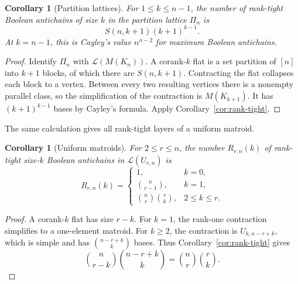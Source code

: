 \documentclass[11pt]{article}
\newtheorem{corollary}[theorem]{Corollary}
\theoremstyle{definition}
\theoremstyle{remark}
\newcommand{\cL}{\mathcal L}
\begin{document}
\begin{corollary}[Partition lattices]\label{cor:partition-lattice}
For $1\le k\le n-1$, the number of rank-tight Boolean antichains of size $k$
in the partition lattice $\Pi_n$ is
\begin{equation}\label{eq:partition-tight}
 S(n,k+1)(k+1)^{k-1}.
\end{equation}
At $k=n-1$, this is Cayley's value $n^{n-2}$ for maximum Boolean
antichains.
\end{corollary}

\begin{proof}
Identify $\Pi_n$ with $\cL(M(K_n))$.  A corank-$k$ flat is a set partition
of $[n]$ into $k+1$ blocks, of which there are $S(n,k+1)$.  Contracting the
flat collapses each block to a vertex.  Between every two resulting vertices
there is a nonempty parallel class, so the simplification of the contraction
is $M(K_{k+1})$.
It has $(k+1)^{k-1}$ bases by Cayley's formula.  Apply
Corollary~\ref{cor:rank-tight}.
\end{proof}

The same calculation gives all rank-tight layers of a uniform matroid.

\begin{corollary}[Uniform matroids]\label{cor:uniform-tight}
For $2\le r\le n$, the number $R_{r,n}(k)$ of rank-tight size-$k$ Boolean
antichains in $\cL(U_{r,n})$ is
\[
 R_{r,n}(k)=
 \begin{cases}
 1,&k=0,\\
 \binom{n}{r-1},&k=1,\\
 \binom nr\binom rk,&2\le k\le r.
 \end{cases}
\]
\end{corollary}

\begin{proof}
A corank-$k$ flat has size $r-k$.  For $k=1$, the rank-one contraction
simplifies to a one-element matroid.  For $k\ge2$, the contraction is
$U_{k,n-r+k}$, which is simple and has $\binom{n-r+k}{k}$ bases.  Thus
Corollary~\ref{cor:rank-tight} gives
\[
 \binom{n}{r-k}\binom{n-r+k}{k}
 =\binom nr\binom rk.
\]
\end{proof}
\end{document}
